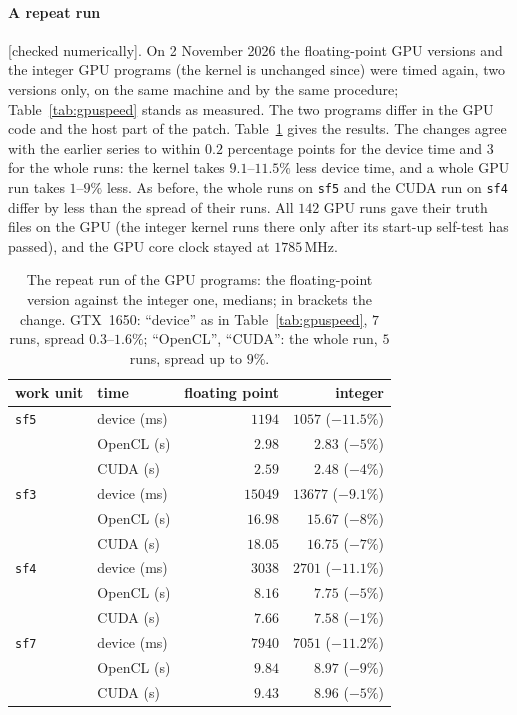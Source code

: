 \documentclass[10pt,a4paper]{article}
\newcommand{\code}[1]{\texttt{#1}}
\newcommand{\stnum}{\textsf{\small[checked numerically]}\xspace}
\theoremstyle{plain}
\theoremstyle{definition}
\begin{document}
\paragraph{A repeat run} \stnum.  On 2 November 2026 the floating-point GPU versions and the integer GPU programs (the kernel is unchanged since) were timed
again, two versions only, on the same machine and by the same procedure; Table~\ref{tab:gpuspeed} stands as measured.  The two programs differ in the GPU code and
the host part of the patch.  Table~\ref{tab:repeat} gives the results.  The changes agree with the earlier series to within $0.2$ percentage points for the device
time and $3$ for the whole runs: the kernel takes $9.1$--$11.5\%$ less device time, and a whole GPU run takes $1$--$9\%$ less.  As before, the whole runs on
\code{sf5} and the CUDA run on \code{sf4} differ by less than the spread of their runs.  All $142$ GPU runs gave their truth files on the GPU (the integer kernel
runs there only after its start-up self-test has passed), and the GPU core clock stayed at $1785$\,MHz.

\begin{table}[ht]
\centering\footnotesize\setlength{\tabcolsep}{4pt}
\caption{The repeat run of the GPU programs: the floating-point version against the integer one, medians; in brackets the change.  GTX~1650: ``device'' as in
Table~\ref{tab:gpuspeed}, $7$ runs, spread $0.3$--$1.6\%$; ``OpenCL'', ``CUDA'': the whole run, $5$ runs, spread up to $9\%$.}\label{tab:repeat}
\begin{tabular}[t]{@{}llrr@{}}
\toprule
work unit & time & floating point & integer \\ \midrule
\code{sf5} & device (ms) & $1194$  & $1057$ ($-11.5\%$) \\
           & OpenCL (s)  & $2.98$  & $2.83$ ($-5\%$) \\
           & CUDA (s)    & $2.59$  & $2.48$ ($-4\%$) \\
\code{sf3} & device (ms) & $15049$ & $13677$ ($-9.1\%$) \\
           & OpenCL (s)  & $16.98$ & $15.67$ ($-8\%$) \\
           & CUDA (s)    & $18.05$ & $16.75$ ($-7\%$) \\
\code{sf4} & device (ms) & $3038$  & $2701$ ($-11.1\%$) \\
           & OpenCL (s)  & $8.16$  & $7.75$ ($-5\%$) \\
           & CUDA (s)    & $7.66$  & $7.58$ ($-1\%$) \\
\code{sf7} & device (ms) & $7940$  & $7051$ ($-11.2\%$) \\
           & OpenCL (s)  & $9.84$  & $8.97$ ($-9\%$) \\
           & CUDA (s)    & $9.43$  & $8.96$ ($-5\%$) \\ \bottomrule
\end{tabular}
\end{table}
\end{document}
